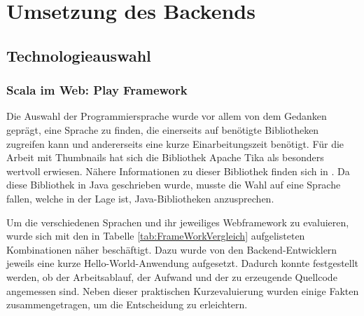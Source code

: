\chapter{Umsetzung des Backends}

\section{Technologieauswahl}

\subsection{Scala im Web: Play Framework}
Die Auswahl der Programmiersprache wurde vor allem von dem Gedanken geprägt, eine Sprache zu finden, die einerseits auf benötigte Bibliotheken zugreifen kann und andererseits eine kurze Einarbeitungszeit benötigt. Für die Arbeit mit Thumbnails hat sich die Bibliothek Apache Tika als besonders wertvoll erwiesen. Nähere Informationen zu dieser Bibliothek finden sich in \cite{bp-dome}. Da diese Bibliothek in Java geschrieben wurde, musste die Wahl auf eine Sprache fallen, welche in der Lage ist, Java-Bibliotheken anzusprechen. 

Um die verschiedenen Sprachen und ihr jeweiliges Webframework zu evaluieren, wurde sich mit den in Tabelle \ref{tab:FrameWorkVergleich} aufgelisteten Kombinationen näher beschäftigt. Dazu wurde von den Backend-Entwicklern jeweils eine kurze Hello-World-Anwendung aufgesetzt. Dadurch konnte festgestellt werden, ob der Arbeitsablauf, der Aufwand und der zu erzeugende Quellcode angemessen sind. Neben dieser praktischen Kurzevaluierung wurden einige Fakten zusammengetragen, um die Entscheidung zu erleichtern.

